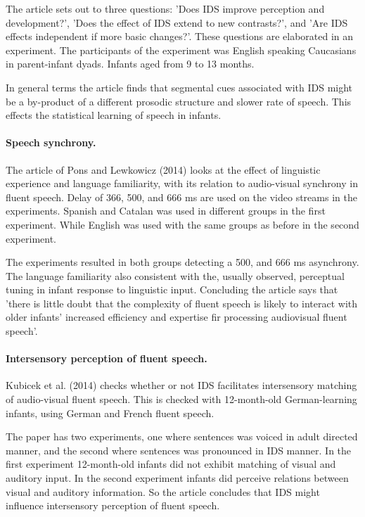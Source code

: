 \documentclass[12pt, a4paper]{article}
\begin{document}
The article sets out to three questions: 'Does IDS improve perception and
development?', 'Does the effect of IDS extend to new contrasts?', and 'Are IDS
effects independent if more basic changes?'\cite{idsdev}. These questions are
elaborated in an experiment. The participants of the experiment was English
speaking Caucasians in parent-infant dyads. Infants aged from 9 to 13 months.  

In general terms the article finds that segmental cues associated with IDS
might be a by-product of a different prosodic structure and slower rate of
speech. This effects the statistical learning of speech in infants. 

\paragraph{Speech synchrony.}
The article of Pons and Lewkowicz (2014) looks at the effect of linguistic
experience and language familiarity, with its relation to audio-visual
synchrony in fluent speech. Delay of 366, 500, and 666 ms are used on the video
streams in the experiments. Spanish and Catalan was used in different groups in the first
experiment. While English was used with the same groups as before in the second
experiment. \cite{speechsynchrony}

The experiments resulted in both groups detecting a 500, and 666 ms asynchrony.
The language familiarity also consistent with the, usually observed, perceptual
tuning in infant response to linguistic input. Concluding the article says that
'there is little doubt that the complexity of fluent
speech is likely to interact with older infants' increased efficiency and
expertise fir processing audiovisual fluent speech'\cite{speechsynchrony}. 

\paragraph{Intersensory perception of fluent speech.}
Kubicek et al. (2014) checks whether or not IDS facilitates intersensory
matching of audio-visual fluent speech. This is checked with 12-month-old
German-learning infants, using German and French fluent speech. 

The paper has two experiments, one where sentences was voiced in adult directed
manner, and the second where sentences was pronounced in IDS manner. In the
first experiment 12-month-old infants did not exhibit matching of visual and
auditory input. In the second experiment infants did perceive relations between
visual and auditory information. So the article concludes that IDS might
influence intersensory perception of fluent speech. 
\end{document}
